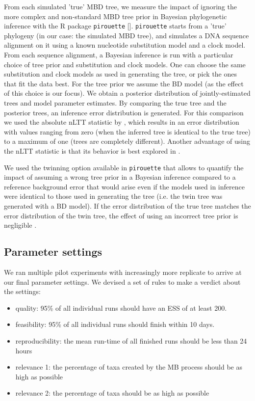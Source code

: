From each simulated 'true' MBD tree, we measure the impact of
ignoring the more complex and non-standard MBD tree prior in
Bayesian phylogenetic inference with the R package \verb;pirouette; [\citep{pirouette}].
 \verb;pirouette; starts from a 'true'  phylogeny (in our case: the simulated MBD tree), and simulates a DNA sequence alignment on it using a known nucleotide substitution model and a clock model. 
From each sequence alignment, a Bayesian inference is run with a particular choice of tree prior and substitution and clock models. One can choose the same substitution and clock models as used in generating the tree, or pick the ones that fit the data best. For the tree prior we assume the BD model (as the effect of this choice is our focus). We obtain a posterior distribution of jointly-estimated trees and model parameter estimates.
By comparing the true tree and the posterior trees, an inference error distribution is generated. For this comparison we used the absolute nLTT statistic by \citet{janzen2015}, which results in an error distribution with values ranging from zero (when the inferred tree is identical to the true tree) to a maximum of one (trees are completely different).
Another advantage of using the nLTT statistic is that its behavior is best
explored in \citet{bilderbeek2019pirouette}.

We used the twinning option available in \verb;pirouette; that allows to quantify the impact of assuming a wrong tree prior in a Bayesian inference compared to a reference background error that would arise even if the models used in inference were identical to those used in generating the tree (i.e. the twin tree was generated with a BD model).
If the error distribution of the true tree matches the error distribution
of the twin tree, the effect of using an incorrect tree prior is negligible \citet{bilderbeek2019pirouette}.

\subsection{Parameter settings}

We ran multiple pilot experiments with increasingly more replicate to arrive 
at our final parameter settings. We devised a set of rules to make a 
verdict about the settings:

\begin{itemize}
  \item quality: 95\% of all individual runs should have an ESS of at least 200.
  \item feasibility: 95\% of all individual runs should finish within 10 days.
  \item reproducibility: the mean run-time of all finished runs should be less than 24 hours 
  \item relevance 1: the percentage of taxa created by the MB process should be
    as high as possible
  \item relevance 2: the percentage of taxa should be
    as high as possible
\end{itemize}

